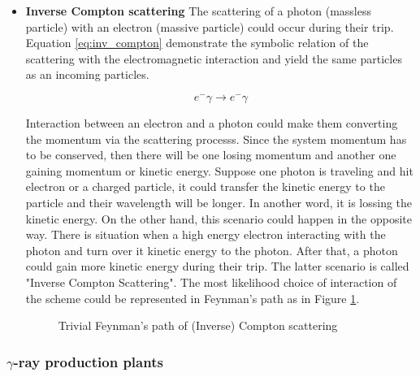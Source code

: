 \begin{itemize}
    \item \textbf{Inverse Compton scattering}
    The scattering of a photon (massless particle) with an electron 
    (massive particle) could occur during their trip. Equation \ref{eq:inv_compton} 
    demonstrate the symbolic relation of the scattering with the 
    electromagnetic interaction and yield the same particles as an 
    incoming particles.

    \begin{equation}
        e^-\gamma \rightarrow e^-\gamma
        \label{eq:inv_compton}
    \end{equation}

    Interaction between an electron and a photon could 
    make them converting the momentum via the scattering
    processs. Since the system momentum has to be conserved,
    then there will be one losing momentum and another one gaining 
    momentum or kinetic energy. Suppose one photon is traveling 
    and hit electron or a charged particle, it could transfer the 
    kinetic energy to the particle and their wavelength will be 
    longer. In another word, it is lossing the kinetic energy.
    On the other hand, this scenario could happen in the opposite way.
    There is situation when a high energy electron interacting with 
    the photon and turn over it kinetic energy to the photon. After that,
    a photon could gain more kinetic energy during their trip. 
    The latter scenario is called "Inverse Compton Scattering".
    The most likelihood choice of interaction of the scheme could be 
    represented in Feynman's path as in Figure \ref{fig:compton_feynman}.

    \begin{figure}[h!]
        \centering
            \hfill
            \caption{Trivial Feynman's path of (Inverse) Compton scattering}
           \label{fig:compton_feynman}
    \end{figure}
\end{itemize}




\subsubsection{$\gamma$-ray production plants}



